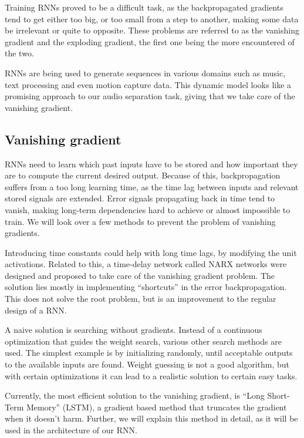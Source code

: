 \documentclass[../Thesis.tex]{subfiles}
\begin{document}
Training RNNs proved to be a difficult task, as the backpropagated gradients tend to get either too big, or too small from a step to another, making some data be irrelevant or quite to opposite. These problems are referred to as the vanishing gradient and the exploding gradient, the first one being the more encountered of the two.

RNNs are being used to generate sequences in various domains such as music, text processing and even motion capture data. This dynamic model looks like a promising approach to our audio separation task, giving that we take care of the vanishing gradient.

\subsection {Vanishing gradient}

RNNs need to learn which past inputs have to be stored and how important they are to compute the current desired output. Because of this, backpropagation suffers from a too long learning time, as the time lag between inputs and relevant stored signals are extended. Error signals propagating back in time tend to vanish, making long-term dependencies hard to achieve or almost impossible to train. We will look over a few methods to prevent the problem of vanishing gradients.

Introducing time constants could help with long time lags, by modifying the unit activations. Related to this, a time-delay network called NARX networks were designed and proposed to take care of the vanishing gradient problem. The solution lies mostly in implementing “shortcuts” in the error backpropagation. This does not solve the root problem, but is an improvement to the regular design of a RNN.

A naive solution is searching without gradients. Instead of a continuous optimization that guides the weight search, various other search methods are used. The simplest example is by initializing randomly, until acceptable outputs to the available inputs are found. Weight guessing is not a good algorithm, but with certain optimizations it can lead to a realistic solution to certain easy tasks.  

Currently, the most efficient solution to the vanishing gradient, is “Long Short-Term Memory” (LSTM), a gradient based method that truncates the gradient when it doesn’t harm. Further, we will explain this method in detail, as it will be used in the architecture of our RNN. 
\end{document}
